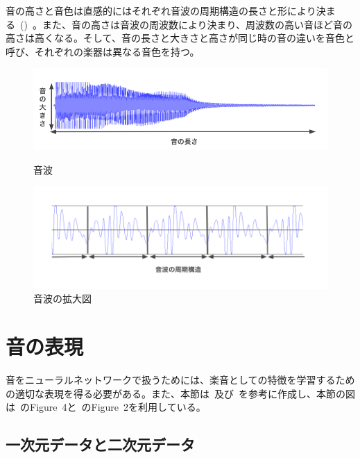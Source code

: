 音の高さと音色は直感的にはそれぞれ音波の周期構造の長さと形により決まる~()~。また、音の高さは音波の周波数により決まり、周波数の高い音ほど音の高さは高くなる。そして、音の長さと大きさと高さが同じ時の音の違いを音色と呼び、それぞれの楽器は異なる音色を持つ。

\begin{figure}[b]
\centering
\begin{minipage}{0.48\columnwidth}
\centering
\includegraphics[width=\columnwidth]{figure/gakuon1.png}
\caption{音波}
\label{fig:gakuon1}
\end{minipage}
\begin{minipage}{0.48\columnwidth}
\centering
\includegraphics[width=\columnwidth]{figure/gakuon2.png}
\caption{音波の拡大図}
\label{fig:gakuon2}
\end{minipage}
\end{figure}

\clearpage

\section{音の表現}

音をニューラルネットワークで扱うためには、楽音としての特徴を学習するための適切な表現を得る必要がある。また、本節は~\cite{musictutorial}及び~\cite{DL_ASP}を参考に作成し、本節の図は~\cite{musictutorial}のFigure~4と~\cite{timbretron}のFigure~2を利用している。

\subsection{一次元データと二次元データ}

